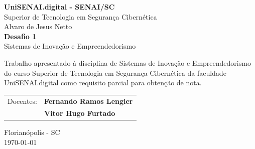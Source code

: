 \begin{titlepage}
    \centering
    
    {\large \textbf{UniSENAI.digital - SENAI/SC}} \\
    {\large Superior de Tecnologia em Segurança Cibernética} \\[3cm]
    
    {\large Alvaro de Jesus Netto} \\[4cm]
    
    {\Large \textbf{Desafio 1}} \\
    {\large Sistemas de Inovação e Empreendedorismo} \\[3cm]
    
    \begin{flushright}
        \begin{minipage}{0.6\textwidth}
            \singlespacing
            Trabalho apresentado à disciplina de 
            Sistemas de Inovação e Empreendedorismo 
            do curso Superior de Tecnologia em 
            Segurança Cibernética da faculdade \mbox{UniSENAI.digital} 
            como requisito parcial para obtenção de nota.
            
            \vspace{0.5cm}
            \begin{tabular}{ll}
                Docentes: & \textbf{Fernando Ramos Lengler} \\
                          & \textbf{Vitor Hugo Furtado}
            \end{tabular}
        \end{minipage}
    \end{flushright}
    
    \vfill
    
    {\large Florianópolis - SC} \\
    {\large \today}
    
\end{titlepage}
